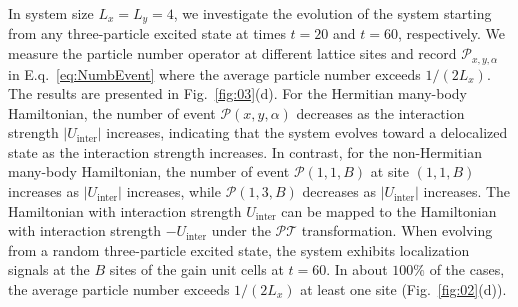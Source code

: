 \documentclass[longbibliography, aps, prx, amsmath, amssymb, amsfonts, twocolumn,superscriptaddress, footinbib]{revtex4-1}
\begin{document}
	In system size $L_x = L_y = 4$, we investigate the evolution of the system starting from any three-particle excited state at times $t = 20$ and $t = 60$, respectively. We measure the particle number operator at different lattice sites and record $\mathcal{P}_{x,y,\alpha}$ in E.q.~\ref{eq:NumbEvent} where the average particle number exceeds $1/(2L_x)$. The results are presented in Fig.~\ref{fig:03}(d).
	For the Hermitian many-body Hamiltonian, the number of event $\mathcal{P}(x,y,\alpha)$ decreases as the interaction strength $\vert U_{\text{inter}}\vert $ increases, indicating that the system evolves toward a delocalized state as the interaction strength increases. 
	In contrast, for the non-Hermitian many-body Hamiltonian, the number of event $\mathcal{P}(1,1,B)$ at site $(1,1,B)$ increases as $\vert U_{\text{inter}}\vert$ increases, while $\mathcal{P}(1,3,B)$ decreases as $\vert U_{\text{inter}}\vert$ increases. 
	The Hamiltonian with interaction strength $U_{\text{inter}}$ can be mapped to the Hamiltonian with interaction strength $-U_{\text{inter}}$ under the $\mathcal{PT}$ transformation.
	When evolving from a random three-particle excited state, the system exhibits localization signals at the $B$ sites of the gain unit cells at $t=60$.
	In about $100\%$ of the cases, the average particle number exceeds $1/(2L_x)$ at least one site (Fig.~\ref{fig:02}(d)).

\end{document}
